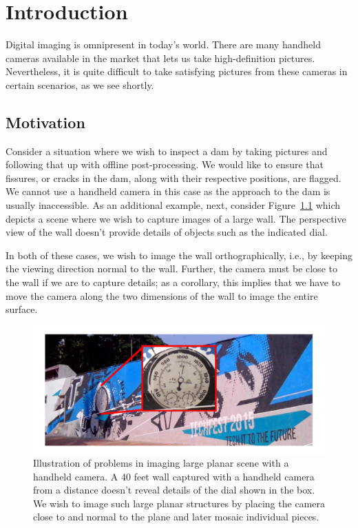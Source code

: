 \chapter{Introduction}
\label{ch:intro}
Digital imaging is omnipresent in today's world. There are many
handheld cameras available in the market that lets us take
high-definition pictures. Nevertheless, it is quite difficult to take
satisfying pictures from these cameras in certain scenarios, as we see
shortly.

\section{Motivation}

Consider a situation where we wish to inspect a dam by taking
pictures and following that up with offline post-processing.  We
would like to ensure that fissures, or cracks in the dam, along with
their respective positions, are flagged.  We cannot use a handheld
camera in this case as the approach to the dam is usually
inaccessible. As an additional example, next, consider
Figure~\ref{fig:orthographicView} which depicts a scene where
we wish to capture images of a large wall. The perspective view of the
wall doesn't provide details of objects such as the indicated dial.

In both of these cases, we wish to image the wall orthographically, i.e.,
by keeping the viewing direction normal to the wall.  Further, the
camera must be close to the wall if we are to capture details; as a
corollary, this implies that we have to move the camera along the two
dimensions of the wall to image the entire surface.

\begin{figure}[h!]
\centering
\includegraphics[width=0.98\linewidth]{figures/orthographicView}
\caption[Problems in imaging a large scene using a handheld
  camera]{Illustration of problems in imaging large planar scene with
  a handheld camera. A 40 feet wall captured with a handheld camera
  from a distance doesn't reveal details of the dial shown in the
  box. We wish to image such large planar structures by placing the
  camera close to and normal to the plane and later mosaic individual
  pieces.}
\label{fig:orthographicView}
\end{figure}


